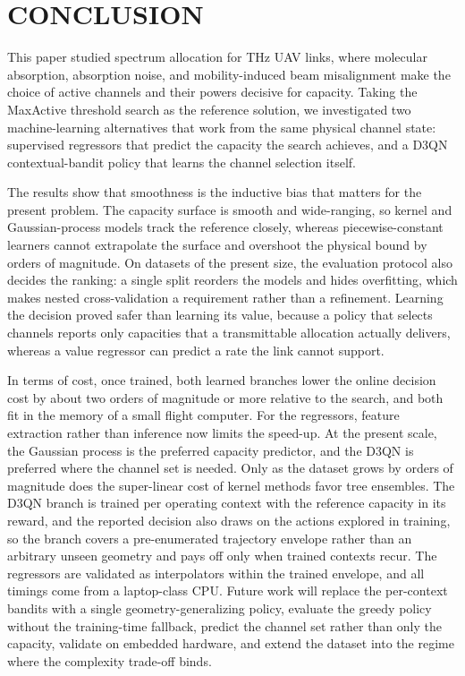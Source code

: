 \documentclass{ieee-ojvt}
\begin{document}
\section{CONCLUSION}
\label{sec:conc}
This paper studied spectrum allocation for THz UAV links, where molecular absorption,
absorption noise, and mobility-induced beam misalignment make the choice of active
channels and their powers decisive for capacity. Taking the MaxActive threshold search as
the reference solution, we investigated two machine-learning alternatives that work from
the same physical channel state: supervised regressors that predict the capacity the
search achieves, and a D3QN contextual-bandit policy that learns the channel selection
itself.

The results show that smoothness is the inductive bias that matters for the present
problem. The capacity surface is smooth and wide-ranging, so kernel and Gaussian-process
models track the reference closely, whereas piecewise-constant learners cannot
extrapolate the surface and overshoot the physical bound by orders of magnitude. On
datasets of the present size, the evaluation protocol also decides the ranking: a single
split reorders the models and hides overfitting, which makes nested cross-validation a
requirement rather than a refinement. Learning the decision proved safer than learning
its value, because a policy that selects channels reports only capacities that a
transmittable allocation actually delivers, whereas a value regressor can predict a rate
the link cannot support.

In terms of cost, once trained, both learned branches lower the online decision cost by
about two orders of magnitude or more relative to the search, and both fit in the memory
of a small flight computer. For the regressors, feature extraction rather than inference
now limits the speed-up. At the present scale, the Gaussian process is the preferred
capacity predictor, and the D3QN is preferred where the channel set is needed. Only as
the dataset grows by orders of magnitude does the super-linear cost of kernel methods
favor tree ensembles. The D3QN branch is trained per operating context with the reference
capacity in its reward, and the reported decision also draws on the actions explored in
training, so the branch covers a pre-enumerated trajectory envelope rather than an
arbitrary unseen geometry and pays off only when trained contexts recur. The regressors
are validated as interpolators within the trained envelope, and all timings come from a
laptop-class CPU. Future work
will replace the per-context bandits with a single geometry-generalizing policy, evaluate
the greedy policy without the training-time fallback, predict the channel set rather than
only the capacity, validate on embedded hardware, and extend the dataset into the regime
where the complexity trade-off binds.
\end{document}

